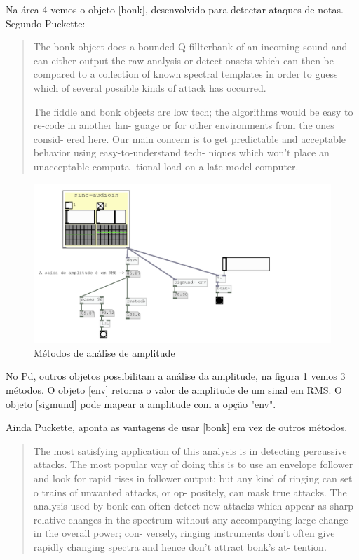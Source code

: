 \documentclass{ppgmus}
\begin{document}


Na área 4 vemos o objeto [bonk\texttildelow], desenvolvido para
detectar ataques de notas. Segundo Puckette:


\begin{quotation}
 The bonk object does a bounded-Q fillterbank of an incoming sound and
can either output the raw analysis or detect onsets
which can then be compared to a collection of known
spectral templates in order to guess which of several
possible kinds of attack has occurred.

The fiddle and bonk objects are low tech; the
algorithms would be easy to re-code in another lan-
guage or for other environments from the ones consid-
ered here. Our main concern is to get predictable and
acceptable behavior using easy-to-understand tech-
niques which won't place an unacceptable computa-
tional load on a late-model computer.
\end{quotation}

\begin{figure}
\includegraphics[scale=.5]{bonks}
\caption{Métodos de análise de amplitude}
\label{bonks} 
\end{figure}


No Pd, outros objetos possibilitam a análise da amplitude,
na figura \ref{bonks} vemos 3 métodos. O objeto [env\texttildelow]
retorna o valor de amplitude de um sinal em RMS. O objeto
[sigmund\texttildelow] pode mapear a amplitude com a opção
"env".


Ainda Puckette, aponta as vantagens de usar [bonk\texttildelow]
em vez de outros métodos.

\begin{quotation}
 
The most satisfying application of this analysis is in
detecting percussive attacks. The most popular way
of doing this is to use an envelope follower and look
for rapid rises in follower output; but any kind of
ringing can set o trains of unwanted attacks, or op-
positely, can mask true attacks. The analysis used by
bonk can often detect new attacks which appear as
sharp relative changes in the spectrum without any
accompanying large change in the overall power; con-
versely, ringing instruments don't often give rapidly
changing spectra and hence don't attract bonk's at-
tention.
\end{quotation}
\end{document}
